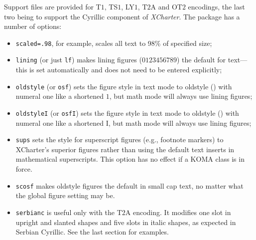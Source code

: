 \documentclass[11pt]{article}
\begin{document}
Support files are provided for T$1$, TS$1$, LY$1$, T$2$A and OT$2$ encodings, the last two being to support the Cyrillic component of \emph{XCharter}. The package has  a number of options:
\begin{itemize}
\item
{\tt scaled=.98}, for example, scales all text to 98\% of specified size;
\item {\tt lining} (or just {\tt lf}) makes lining figures ($0123456789$) the default for text---this is set automatically and does not need to be entered explicitly;
\item {\tt oldstyle} (or {\tt osf}) sets the figure style in text mode to oldstyle () with numeral one like a shortened  $1$, but math mode will always use lining figures;
\item {\tt oldstyleI} (or {\tt osfI}) sets the figure style in text mode to oldstyle () with numeral one like a shortened I, but math mode will always use lining figures;
\item {\tt sups} sets the style for superscript figures (e.g., footnote markers) to XCharter's superior figures rather than using the default text inserts in mathematical superscripts. This option has no effect if a KOMA class is in force.
\item {\tt scosf} makes oldstyle figures the default in small cap text, no matter what the global figure setting may be.
\item {\tt serbianc} is useful only with the T$2$A encoding. It modifies
one slot in upright and slanted shapes and five slots in italic shapes, as expected in Serbian Cyrillic. See the last section for examples.
\end{itemize}
\end{document}
